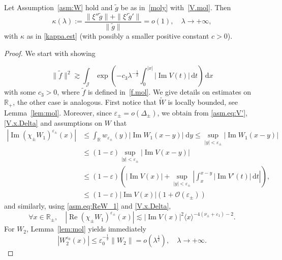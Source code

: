 \begin{Lemma}
Let Assumption~\ref{asm:W} hold and 
$\tilde g$ be as in~\eqref{moly} with~\eqref{V.mol}.
Then 
\begin{equation}\label{cut.rates.mol}
\kappa(\lambda) :=
\frac{\|\xi'' \tilde g\| + \|\xi' \tilde g'\|}{\|\tilde g\|} 
= o(1), \quad \lambda \to + \infty,
\end{equation}
with $\kappa$ as in \eqref{kappa.est} (with possibly a smaller positive constant $c>0$).
\end{Lemma}
\begin{proof}
We start with showing 	
	
\begin{equation}\label{f.lb.mol}
\|\tilde f\|^2 {\gtrsim} \int_{\mathcal J} \exp \left(-c_3 \lambda^{-\frac 12} \int_0^{|x|} |{\operatorname{Im}} V(t)| \, {\mathrm{d}} t  \right) \, {\mathrm{d}} x
\end{equation}
	with some $c_3>0$, where $\tilde f$ is defined in~\eqref{f.mol}. 
We give details on estimates on ${\mathbb{R}}_+$, the other case is analogous. 
First notice that $\tilde{W}$ is locally bounded, see Lemma~\ref{lem:mol}.
Moreover, since ${\varepsilon}_\pm = o(\Delta_\pm)$, 
we obtain from \eqref{asm.eq:V'}, \eqref{V.x.Delta} and assumptions on $W$ that
\begin{equation}\label{ImW1.V}
\begin{aligned}
|{\operatorname{Im}}(\chi_\pm W_1)^{{\varepsilon}_\pm}(x)| 
&\leq 
\int_{\mathbb{R}} w_{{\varepsilon}_\pm}(y) |{\operatorname{Im}} W_1(x-y)| \; {\mathrm{d}} y 
\leq 
\sup_{|y|<{\varepsilon}_\pm} |{\operatorname{Im}} W_1(x-y)| 
\\
&\leq 
(1-{\varepsilon})\sup_{|y|<{\varepsilon}_\pm} |{\operatorname{Im}} V(x-y)|
\\
& \leq (1-{\varepsilon}) \left(|{\operatorname{Im}} V(x)| 
+ \sup_{|y|<{\varepsilon}_\pm} \left| \int_x^{x-y}|{\operatorname{Im}} V'(t)| \, {\mathrm{d}} t \right| \right),
\\
&\leq (1-{\varepsilon})|{\operatorname{Im}} V(x)| (1+ {\mathcal{O}}({\varepsilon}_\pm))
\end{aligned}
\end{equation}
and similarly, using \eqref{asm.eq:ReW_1} and \eqref{V.x.Delta},
\begin{equation}\label{ReW1.V}
\forall x \in {\mathbb{R}}_\pm, \quad |{\operatorname{Re}} (\chi_\pm W_1)^{{\varepsilon}_\pm}(x)| 
{\lesssim} 
|{\operatorname{Im}} V(x)|^2 \langle x \rangle^{-4(\nu_\pm + {\varepsilon}_1)-2}.
\end{equation}
For $W_2$, Lemma~\ref{lem:mol} yields immediately
\begin{equation}\label{W2.est}
|W_2^{{\varepsilon}_0}(x)| \leq {\varepsilon}_0^{-\frac 12} \|W_2\| = o\left(\lambda^\frac12 \right), \quad \lambda \to +\infty.
\end{equation}


\end{proof}

